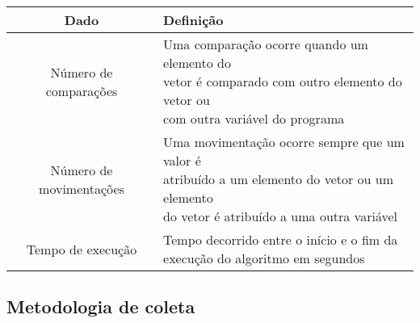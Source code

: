 \begin{table}[H]
    \centering
    \begin{tabular}{ | c | l | }
        \hline
        Dado                    & Definição                                                     \\
        \hline
        Número de comparações   & \makecell[l]{Uma comparação ocorre quando um elemento do      \\
                                               vetor é comparado com outro elemento do vetor ou \\
                                               com outra variável do programa}                  \\
        Número de movimentações & \makecell[l]{Uma movimentação ocorre sempre que um valor é    \\
                                               atribuído a um elemento do vetor ou um elemento  \\
                                               do vetor é atribuído a uma outra variável}       \\
        Tempo de execução       & \makecell[l]{Tempo decorrido entre o início e o fim da        \\
                                               execução do algoritmo em segundos}               \\
        \hline
    \end{tabular}
\end{table}

\subsection{Metodologia de coleta}
